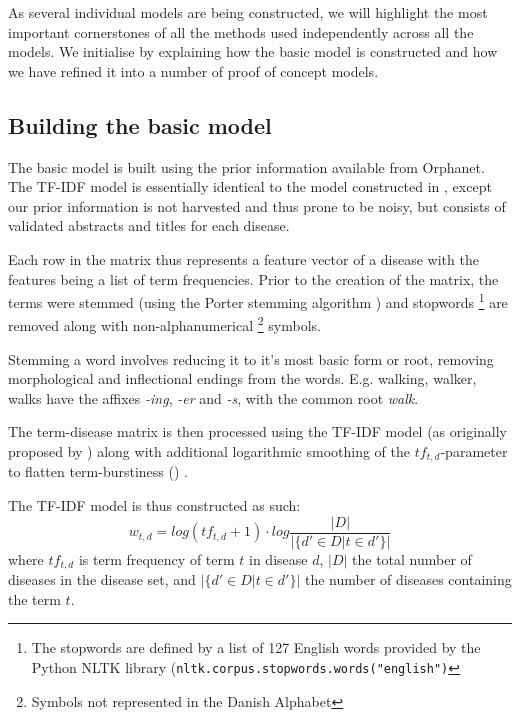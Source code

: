 \documentclass[10pt,letterpaper,final]{article}
\begin{document}
As several individual models are being constructed, we will highlight
the most important cornerstones of all the methods used independently
across all the models.
We initialise by explaining how the basic model is constructed and how
we have refined it into a number of proof of concept models.


\subsection{Building the basic model}
The basic model is built using the prior information available
from Orphanet. The TF-IDF model is essentially identical to the model
constructed in \cite{jensenandersen}, except our prior information is
not harvested and thus prone to be noisy, but consists of validated
abstracts and titles for each disease.


Each row in the matrix thus represents a feature vector of a disease
with the features being a list of term frequencies. Prior to the
creation of the matrix, the terms were stemmed (using the Porter
stemming algorithm \cite{porterstemming}) and stopwords \footnote{The stopwords are defined by a
list of 127 English words provided by the Python NLTK library
(\texttt{nltk.corpus.stopwords.words("english")}} are removed along
with non-alphanumerical \footnote{Symbols not represented in the Danish
Alphabet} symbols.

Stemming a word involves reducing it to it's most basic form or root,
removing morphological and inflectional endings from the words. E.g.
walking, walker, walks have the affixes \textit{-ing}, \textit{-er} and
\textit{-s}, with the common root \textit{walk}.


The term-disease matrix is then processed using the
TF-IDF model (as originally proposed by \cite{tfidf}) along with
additional logarithmic smoothing of the $tf_{t,d}$-parameter to flatten
term-burstiness (\cite{burstiness}) .

The TF-IDF model is thus constructed as such:
\[
w_{t,d} = log(tf_{t,d}+1)\cdot log\frac{|D|}{|\{d'\in D|t\in d'\}|}
\]
where $tf_{t,d}$ is term frequency of term $t$ in disease $d$, $|D|$ 
the total number of diseases in the disease set, and $|\{d'\in D|t\in
d'\}|$ the number of diseases containing the term $t$.
\end{document}
